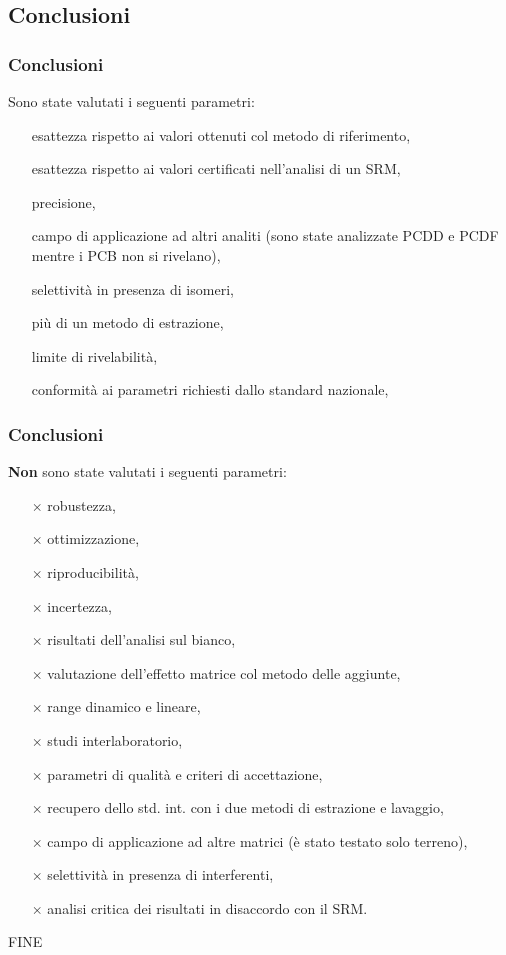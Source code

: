 \subsection{Conclusioni}\begin{frame}\frametitle{Conclusioni}

Sono state valutati i seguenti parametri:\begin{itemize}\pause
\item[\checkmark] esattezza rispetto ai valori ottenuti col metodo di riferimento,
\item[\checkmark] esattezza rispetto ai valori certificati nell'analisi di un SRM,
 \item[\checkmark] precisione,\pause
 \item[\checkmark] campo di applicazione ad altri analiti (sono state analizzate PCDD e PCDF mentre i PCB non si rivelano),
 \item[\checkmark] selettività in presenza di isomeri,\pause
 \item[\checkmark] più di un metodo di estrazione,\pause
 \item[\checkmark] limite di rivelabilità,
 \item[\checkmark] conformità ai parametri richiesti dallo standard nazionale,\end{itemize}
\end{frame}
\begin{frame}\frametitle{Conclusioni}
{\bf Non} sono state valutati i seguenti parametri:\pause\begin{itemize}
 \item[$\times$] robustezza,
 \item[$\times$] ottimizzazione,
 \item[$\times$] riproducibilità,
 \item[$\times$] incertezza,
 \item[$\times$] risultati dell'analisi sul bianco,
 \item[$\times$] valutazione dell'effetto matrice col metodo delle aggiunte,\pause
 \item[$\times$] range dinamico e lineare,\pause
 \item[$\times$] studi interlaboratorio,
 \item[$\times$] parametri di qualità e criteri di accettazione,
 \item[$\times$] recupero dello std. int. con i due metodi di estrazione e lavaggio,\pause
 \item[$\times$] campo di applicazione ad altre matrici (è stato testato solo terreno),\pause
 \item[$\times$] selettività in presenza di interferenti,\pause
 \item[$\times$] analisi critica dei risultati in disaccordo con il SRM.
\end{itemize}
\begin{center}
{\pause \huge FINE}
\end{center}
\end{frame}


